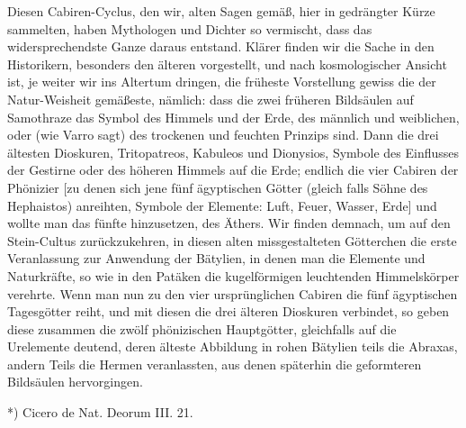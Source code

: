 \documentclass[a4paper, 11pt, oneside, polutonikogreek, german]{article}
\begin{document}
Diesen Cabiren-Cyclus, den wir, alten Sagen gemäß, hier in gedrängter Kürze sammelten, haben Mythologen und Dichter so vermischt, dass das widersprechendste Ganze daraus entstand. Klärer finden wir die Sache in den Historikern, besonders den älteren vorgestellt, und nach kosmologischer Ansicht ist, je weiter wir ins Altertum dringen, die früheste Vorstellung gewiss die der Natur-Weisheit gemäßeste, nämlich: dass die zwei früheren Bildsäulen auf Samothraze das Symbol des Himmels und der Erde, des männlich und weiblichen, oder (wie Varro sagt) des trockenen und feuchten Prinzips sind. Dann die drei ältesten Dioskuren, Tritopatreos, Kabuleos und Dionysios, Symbole des Einflusses der Gestirne oder des höheren Himmels auf die Erde; endlich die vier Cabiren der Phönizier [zu denen sich jene fünf ägyptischen Götter (gleich falls Söhne des Hephaistos) anreihten, Symbole der Elemente: Luft, Feuer, Wasser, Erde] und wollte man das fünfte hinzusetzen, des Äthers. Wir finden demnach, um auf den Stein-Cultus zurückzukehren, in diesen alten missgestalteten Götterchen die erste Veranlassung zur Anwendung der Bätylien, in denen man die Elemente und Naturkräfte, so wie in den Patäken die kugelförmigen leuchtenden Himmelskörper verehrte. Wenn man nun zu den vier ursprünglichen Cabiren die fünf ägyptischen Tagesgötter reiht, und mit diesen die drei älteren Dioskuren verbindet, so geben diese zusammen die zwölf phönizischen Hauptgötter, gleichfalls auf die Urelemente deutend, deren älteste Abbildung in rohen Bätylien teils die Abraxas, andern Teils die Hermen veranlassten, aus denen späterhin die geformteren Bildsäulen hervorgingen.

*) Cicero de Nat. Deorum III. 21.
\end{document}
